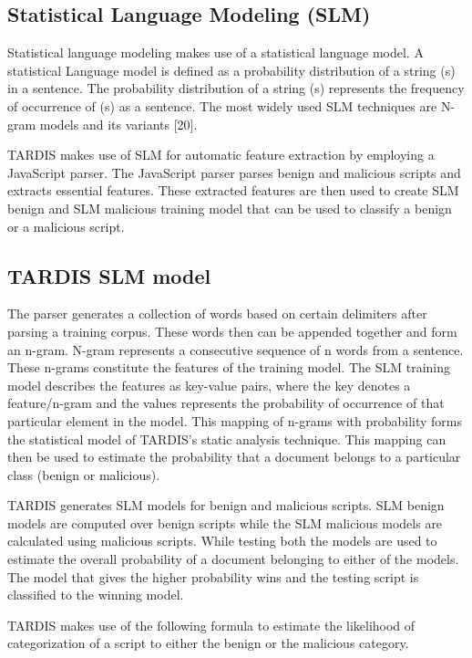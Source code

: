 \subsection{Statistical Language Modeling (SLM) ~\cite{g11}}

Statistical language modeling makes use of a statistical language model. A statistical Language model is defined as a probability distribution of a string (s) in a sentence. The probability distribution of a string (s) represents the frequency of occurrence of (s) as a sentence. The most widely used SLM techniques are N-gram models and its variants [20].

TARDIS makes use of SLM for automatic feature extraction by employing a JavaScript parser. The JavaScript parser parses benign and malicious scripts and extracts essential features. These extracted features are then used to create SLM benign and SLM malicious training model that can be used to classify a benign or a malicious script. 

\subsection{TARDIS SLM model} \label{tardis_slm}

The parser generates a collection of words based on certain delimiters after parsing a training corpus. These words then can be appended together and form an n-gram. N-gram represents a consecutive sequence of n words from a sentence. These n-grams constitute the features of the training model. The SLM training model describes the features as key-value pairs, where the key denotes a feature/n-gram and the values represents the probability of occurrence of that particular element in the model.  This mapping of n-grams with probability forms the statistical model of TARDIS's static analysis technique. This mapping can then be used to estimate the probability that a document belongs to a particular class (benign or malicious).

TARDIS generates SLM models for benign and malicious scripts. SLM benign models are computed over benign scripts while the SLM malicious models are calculated using malicious scripts. While testing both the models are used to estimate the overall probability of a document belonging to either of the models. The model that gives the higher probability wins and the testing script is classified to the winning model.

TARDIS makes use of the following formula to estimate the likelihood of categorization of a script to either the benign or the malicious category.


